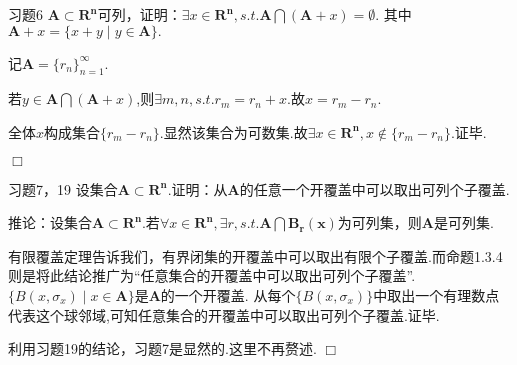 \documentclass[11pt, a4paper, twoside]{ctexbook}
\newenvironment{proof2}{{\noindent\heiti 证明}}{\hfill $\Box $\par}
\begin{document}
    \begin{myproposition}{习题6}{}
        $\mathbf{A}\subset \mathbf{R^{n}}$可列，证明：$\exists x \in \mathbf{R^{n}},s.t.\mathbf{A}\bigcap (\mathbf{A}+x)=\emptyset$.
        其中$\mathbf{A}+x=\{x+y\mid y\in\mathbf{A}\}.$
    \end{myproposition}
    \begin{proof2}
        记$\mathbf{A}=\{r_{n}\}_{n=1}^{\infty}.$

        若$y \in \mathbf{A}\bigcap (\mathbf{A}+x)$,则$\exists m,n, s.t.r_{m}=r_{n}+x$.故$x=r_{m}-r_{n}$.

        全体$x$构成集合$\{r_{m}-r_{n}\}$.显然该集合为可数集.故$\exists x \in \mathbf{R^{n}},x \notin \{r_{m}-r_{n}\}$.证毕.
        
    \end{proof2}


    \begin{myproposition}{习题7，19}{}
        设集合$\mathbf{A}\subset \mathbf{R^{n}}$.证明：从$\mathbf{A}$的任意一个开覆盖中可以取出可列个子覆盖.
        
        
        推论：设集合$\mathbf{A}\subset \mathbf{R^{n}}$.若$\forall x\in \mathbf{R^{n}},\exists r,s.t.\mathbf{A}\bigcap \mathbf{B_{r}(x)}$为可列集，则$\mathbf{A}$是可列集.
    \end{myproposition}
    \begin{proof2}
        有限覆盖定理告诉我们，有界闭集的开覆盖中可以取出有限个子覆盖.而命题1.3.4则是将此结论推广为“任意集合的开覆盖中可以取出可列个子覆盖”.$\{B(x,\sigma _{x})\mid x\in \mathbf{A}\}$是$\mathbf{A}$的一个开覆盖.
        从每个$\{B(x,\sigma _{x})\}$中取出一个有理数点代表这个球邻域,可知任意集合的开覆盖中可以取出可列个子覆盖.证毕.

        利用习题19的结论，习题7是显然的.这里不再赘述.
    \end{proof2}
\end{document}
